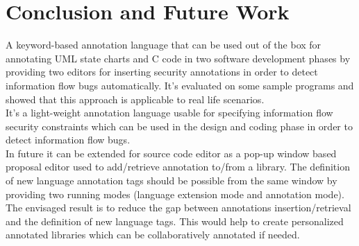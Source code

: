 \chapter{Conclusion and Future Work}
A keyword-based annotation language that can be used out of the box for annotating UML state charts and C code in two software development phases by providing two editors for inserting security annotations in order to detect information flow bugs automatically. It's evaluated on some sample programs and showed that this approach is applicable to real life scenarios.\\
It's a light-weight annotation language usable for specifying
information flow security constraints which can be used in the
design and coding phase in order to detect information flow
bugs.\\
In future it can be extended for source code editor as
a pop-up window based proposal editor used to add/retrieve
annotation to/from a library. The definition of new language
annotation tags should be possible from the same window by
providing two running modes (language extension mode and
annotation mode). The envisaged result is to reduce the gap
between annotations insertion/retrieval and the definition of
new language tags. This would help to create personalized
annotated libraries which can be collaboratively annotated if
needed.